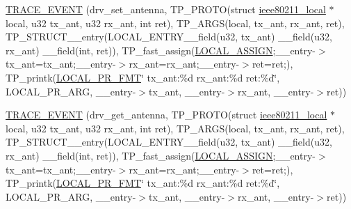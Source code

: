 \begin{DoxyCompactItemize}
\item 
\hyperlink{driver-trace_8h_a5529e34e6f21cb65a2f3ec7987fab66c}{T\-R\-A\-C\-E\-\_\-\-E\-V\-E\-N\-T} (drv\-\_\-set\-\_\-antenna, T\-P\-\_\-\-P\-R\-O\-T\-O(struct \hyperlink{structieee80211__local}{ieee80211\-\_\-local} $\ast$local, u32 tx\-\_\-ant, u32 rx\-\_\-ant, int ret), T\-P\-\_\-\-A\-R\-G\-S(local, tx\-\_\-ant, rx\-\_\-ant, ret), T\-P\-\_\-\-S\-T\-R\-U\-C\-T\-\_\-\-\_\-entry(L\-O\-C\-A\-L\-\_\-\-E\-N\-T\-R\-Y\-\_\-\-\_\-field(u32, tx\-\_\-ant) \-\_\-\-\_\-field(u32, rx\-\_\-ant) \-\_\-\-\_\-field(int, ret)), T\-P\-\_\-fast\-\_\-assign(\hyperlink{driver-trace_8h_ab19d9141887ea92ef9640df06a51e0a1}{L\-O\-C\-A\-L\-\_\-\-A\-S\-S\-I\-G\-N};\-\_\-\-\_\-entry-\/$>$tx\-\_\-ant=tx\-\_\-ant;\-\_\-\-\_\-entry-\/$>$rx\-\_\-ant=rx\-\_\-ant;\-\_\-\-\_\-entry-\/$>$ret=ret;), T\-P\-\_\-printk(\hyperlink{driver-trace_8h_a09833af423135e21ffe99a59ae088cf1}{L\-O\-C\-A\-L\-\_\-\-P\-R\-\_\-\-F\-M\-T}\char`\"{} tx\-\_\-ant\-:\%d rx\-\_\-ant\-:\%d ret\-:\%d\char`\"{}, L\-O\-C\-A\-L\-\_\-\-P\-R\-\_\-\-A\-R\-G, \-\_\-\-\_\-entry-\/$>$tx\-\_\-ant, \-\_\-\-\_\-entry-\/$>$rx\-\_\-ant, \-\_\-\-\_\-entry-\/$>$ret))
\item 
\hyperlink{driver-trace_8h_a5052e3a868bfecb016ab42b97330d005}{T\-R\-A\-C\-E\-\_\-\-E\-V\-E\-N\-T} (drv\-\_\-get\-\_\-antenna, T\-P\-\_\-\-P\-R\-O\-T\-O(struct \hyperlink{structieee80211__local}{ieee80211\-\_\-local} $\ast$local, u32 tx\-\_\-ant, u32 rx\-\_\-ant, int ret), T\-P\-\_\-\-A\-R\-G\-S(local, tx\-\_\-ant, rx\-\_\-ant, ret), T\-P\-\_\-\-S\-T\-R\-U\-C\-T\-\_\-\-\_\-entry(L\-O\-C\-A\-L\-\_\-\-E\-N\-T\-R\-Y\-\_\-\-\_\-field(u32, tx\-\_\-ant) \-\_\-\-\_\-field(u32, rx\-\_\-ant) \-\_\-\-\_\-field(int, ret)), T\-P\-\_\-fast\-\_\-assign(\hyperlink{driver-trace_8h_ab19d9141887ea92ef9640df06a51e0a1}{L\-O\-C\-A\-L\-\_\-\-A\-S\-S\-I\-G\-N};\-\_\-\-\_\-entry-\/$>$tx\-\_\-ant=tx\-\_\-ant;\-\_\-\-\_\-entry-\/$>$rx\-\_\-ant=rx\-\_\-ant;\-\_\-\-\_\-entry-\/$>$ret=ret;), T\-P\-\_\-printk(\hyperlink{driver-trace_8h_a09833af423135e21ffe99a59ae088cf1}{L\-O\-C\-A\-L\-\_\-\-P\-R\-\_\-\-F\-M\-T}\char`\"{} tx\-\_\-ant\-:\%d rx\-\_\-ant\-:\%d ret\-:\%d\char`\"{}, L\-O\-C\-A\-L\-\_\-\-P\-R\-\_\-\-A\-R\-G, \-\_\-\-\_\-entry-\/$>$tx\-\_\-ant, \-\_\-\-\_\-entry-\/$>$rx\-\_\-ant, \-\_\-\-\_\-entry-\/$>$ret))
\item 

\end{DoxyCompactItemize}
